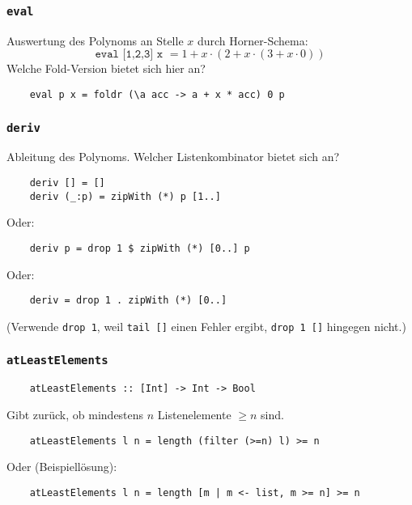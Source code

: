 \documentclass{beamer}
\begin{document}
\begin{frame}[fragile]
  \frametitle{\lstinline{eval}}
  Auswertung des Polynoms an Stelle $x$ durch Horner-Schema:
  \[\texttt{eval [1,2,3] x }= 1 + x\cdot(2 + x\cdot(3 + x\cdot0))\]
  Welche Fold-Version bietet sich hier an?
  \pause
  \begin{lstlisting}
    eval p x = foldr (\a acc -> a + x * acc) 0 p
  \end{lstlisting}
\end{frame}

\begin{frame}[fragile]
  \frametitle{\lstinline{deriv}}
  Ableitung des Polynoms. Welcher Listenkombinator bietet sich an?
  \pause
  \begin{lstlisting}
    deriv [] = []
    deriv (_:p) = zipWith (*) p [1..]
  \end{lstlisting}
  Oder:
  \begin{lstlisting}
    deriv p = drop 1 $ zipWith (*) [0..] p
  \end{lstlisting}
  Oder:
  \begin{lstlisting}
    deriv = drop 1 . zipWith (*) [0..]
  \end{lstlisting}
  (Verwende \lstinline{drop 1}, weil \lstinline{tail []} einen Fehler ergibt, \lstinline{drop 1 []} hingegen nicht.)
\end{frame}

\begin{frame}[fragile]
  \frametitle{\lstinline{atLeastElements}}
  \begin{lstlisting}
    atLeastElements :: [Int] -> Int -> Bool
  \end{lstlisting}
  Gibt zurück, ob mindestens $n$ Listenelemente $\geq n$ sind.
  \pause
  \begin{lstlisting}
    atLeastElements l n = length (filter (>=n) l) >= n
  \end{lstlisting}
  Oder (Beispiellösung):
  \begin{lstlisting}
    atLeastElements l n = length [m | m <- list, m >= n] >= n
  \end{lstlisting}
\end{frame}
\end{document}
